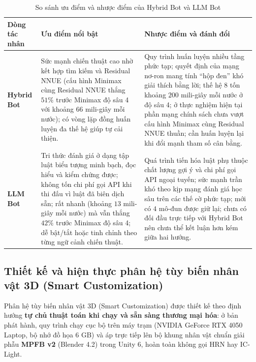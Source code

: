 \begin{table}[H]
    \centering
    \caption{So sánh ưu điểm và nhược điểm của Hybrid Bot và LLM Bot}
    \label{tab:ai_pros_cons}
    \begin{tabularx}{\textwidth}{|L{2.4cm}|Y|Y|}
        \hline
        \textbf{Dòng tác nhân} & \textbf{Ưu điểm nổi bật} & \textbf{Nhược điểm và đánh đổi} \\
        \hline
        \textbf{Hybrid Bot} & Sức mạnh chiến thuật cao nhờ kết hợp tìm kiếm và Residual NNUE (cấu hình Minimax cùng Residual NNUE thắng $51\%$ trước Minimax độ sâu 4 với khoảng $66$ mili-giây mỗi nước); có vòng lặp đồng huấn luyện đa thế hệ giúp tự cải thiện. & Quy trình huấn luyện nhiều tầng phức tạp; quyết định của mạng nơ-ron mang tính ``hộp đen'' khó giải thích bằng lời; thế hệ 8 tốn khoảng $200$ mili-giây mỗi nước ở độ sâu 4; ở thực nghiệm hiện tại phần mạng chính sách chưa vượt cấu hình Minimax cùng Residual NNUE thuần; cần huấn luyện lại khi đổi mạnh tham số cân bằng. \\
        \hline
        \textbf{LLM Bot} & Tri thức đánh giá ở dạng tập luật biểu tượng minh bạch, đọc hiểu và kiểm chứng được; không tốn chi phí gọi API khi thi đấu vì luật đã biên dịch sẵn; rất nhanh (khoảng $13$ mili-giây mỗi nước) mà vẫn thắng $42\%$ trước Minimax độ sâu 4; dễ bật/tắt hoặc tinh chỉnh theo từng ngữ cảnh chiến thuật. & Quá trình tiến hóa luật phụ thuộc chất lượng gợi ý và chi phí gọi API ngoại tuyến; sức mạnh trần khó theo kịp mạng đánh giá học sâu trên các thế cờ phức tạp; mới có $4$ mô-đun được giữ lại; chưa có đối đầu trực tiếp với Hybrid Bot nên chưa thể kết luận hơn kém giữa hai hướng. \\
        \hline
    \end{tabularx}
\end{table}

\subsection{Thiết kế và hiện thực phân hệ tùy biến nhân vật 3D (Smart Customization)}

Phân hệ tùy biến nhân vật 3D (Smart Customization) được thiết kế theo định hướng \textbf{tự chủ thuật toán khi chạy và sẵn sàng thương mại hóa}: ở bản phát hành, quy trình chạy cục bộ trên máy trạm (NVIDIA GeForce RTX 4050 Laptop, bộ nhớ đồ họa 6 GB) và áp trực tiếp lên bộ khung nhân vật chuẩn giải phẫu \textbf{MPFB v2} \cite{mpfb2} (Blender 4.2) trong Unity 6, hoàn toàn không gọi HRN hay IC-Light.

